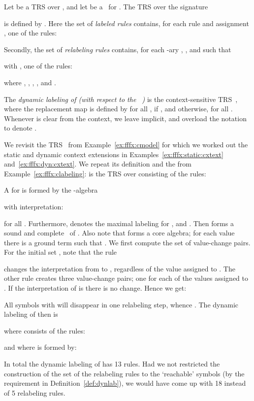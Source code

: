 \begin{definition}\label{def:dynlab}
  Let  be a TRS over , 
  and let  be a \clabeling\ for .
  The TRS  over the signature 
  
is defined by 
  . 
  Here the set  of \emph{labeled rules} contains,   
  for each rule  and assignment ,
  one of the rules:
  
Secondly, the set  of 
  \emph{relabeling rules} contains,
  for each -ary , , 
  and  
such that 
   
  with ,
  one of the rules:
  
  where 
  ,
  ,
  ,
  , 
  and .

  The \emph{dynamic labeling of  (with respect to the \clabeling~)}
  is the context-sensitive TRS~,
  where the replacement map  is defined by 
   for all ,
   if ,
  and  otherwise,
  for all .
Whenever  is clear from the context, we leave  implicit,
  and overload the notation  to denote 
  .
\end{definition}


\begin{example}
  We revisit the TRS~ from Example~\ref{ex:fffx:cmodel} 
  for which we worked out the static and dynamic context extensions 
  in Examples~\ref{ex:fffx:static:cxtext} and~\ref{ex:fffx:dyn:cxtext}.
  We repeat its definition and the \clabeling{} from Example~\ref{ex:fffx:clabeling}:  is the TRS over  consisting of the rules:
   
  A \cmodel{} for  is formed by the -algebra 
  
  with interpretation:
  
  for all .
  Furthermore,  denotes the maximal labeling for , 
  and .
Then 
  forms a sound and complete \clabeling\ of .
Also note that  forms a core algebra;
  for each value  there is a ground term  such that 
  .
We first compute the set  of value-change pairs. 
  For the initial set , note that the rule 
   
  changes the interpretation from  to , regardless of the value assigned to .
The other rule creates three value-change pairs; one for each of the values  assigned to . 
  If the interpretation of  is  there is no change.
  Hence we get:
  
All symbols  with  
  will disappear in one relabeling step, whence .
The dynamic labeling of  then is
  
  where  consists of the rules:
  
  and where  is formed by:
  
  In total the dynamic labeling of  has 13 rules. 
Had we not restricted the construction of the set of the relabeling rules to 
  the `reachable' symbols  
  (by the requirement  in Definition~\ref{def:dynlab}),
  we would have come up with 18 instead of 5 relabeling rules.
\end{example}

